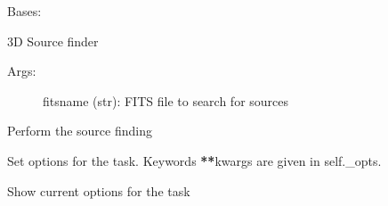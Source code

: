 \documentclass[letterpaper,10pt,english]{sphinxmanual}
\begin{document}
\begin{fulllineitems}
\label{\detokenize{pybb_api:pyBBarolo.pyBBarolo.Search}}
Bases: {\hyperref[\detokenize{pybb_api:pyBBarolo.pyBBarolo.Task}]{}}

3D Source finder
\begin{description}
\item[{Args:}] \leavevmode
fitsname (str): FITS file to search for sources

\end{description}

\begin{fulllineitems}
\label{\detokenize{pybb_api:pyBBarolo.pyBBarolo.Search.search}}
Perform the source finding

\end{fulllineitems}


\begin{fulllineitems}
\label{\detokenize{pybb_api:pyBBarolo.pyBBarolo.Search.set_options}}
Set options for the task. Keywords {\color{red}\bfseries{}**}kwargs are given in self.\_opts.

\end{fulllineitems}


\begin{fulllineitems}
\label{\detokenize{pybb_api:pyBBarolo.pyBBarolo.Search.show_options}}
Show current options for the task

\end{fulllineitems}


\end{fulllineitems}

\end{document}
